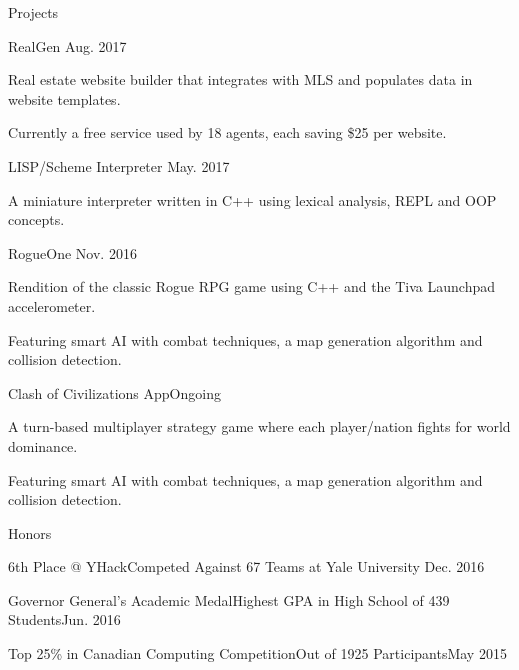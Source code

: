 \documentclass{resume} %
\begin{document}

\begin{rSection}{Projects}

\begin{projSec}{RealGen \href{https://github.com/jsun98/RealGen}{\space\faGithub}}{Aug. 2017}
\item Real estate website builder that integrates with MLS and populates data in website templates.
\item Currently a free service used by 18 agents, each saving \$25 per website.
\end{projSec}

\begin{projSec}{LISP/Scheme Interpreter \href{https://github.com/jsun98/SchemePlusPlus}{\space\faGithub}}{May. 2017}
\item A miniature interpreter written in C++ using lexical analysis, REPL and OOP concepts.
\end{projSec}

\begin{projSec}{RogueOne \href{https://github.com/jsun98/RogueOne}{\space\faGithub}}{Nov. 2016}
\item Rendition of the classic Rogue RPG game using C++ and the Tiva Launchpad accelerometer.
\item Featuring smart AI with combat techniques, a map generation algorithm and collision detection.
\end{projSec}

\begin{projSec}{Clash of Civilizations App}{Ongoing}
\item A turn-based multiplayer strategy game where each player/nation fights for world dominance.
\item Featuring smart AI with combat techniques, a map generation algorithm and collision detection.
\end{projSec}


\end{rSection}


\begin{rSection}{Honors}

\begin{honorSec}{6th Place @ YHack}{Competed Against 67 Teams at Yale University \href{https://devpost.com/software/yhack_unity_zombies}{\space\small\faExternalLink}}{Dec. 2016}\end{honorSec}
\begin{honorSec}{Governor General's Academic Medal}{Highest GPA in High School of 439 Students}{Jun. 2016}\end{honorSec}
\begin{honorSec}{Top 25\% in Canadian Computing Competition}{Out of 1925 Participants}{May 2015}\end{honorSec}
\vspace{1em} 

\end{rSection}
\end{document}

